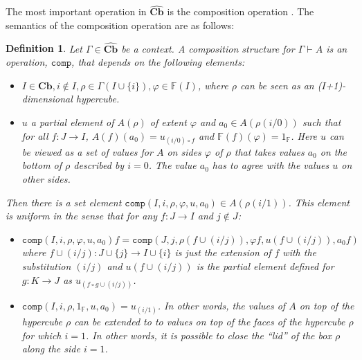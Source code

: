 \documentclass[12pt,a4paper,twoside,xetex]{book} %
\newcommand{\keyword}[1]{\emph{#1}\index{#1}}
\newtheorem{definition}[theorem]{Definition}
\newcommand{\psh}[1]{\widehat{#1}}
\newcommand{\op}[1]{\mathtt{#1}}
\newcommand{\cube}[0]{\textbf{Cb}}
\begin{document}
The most important operation in $\psh{\cube}$ is the composition operation 
\cite{Orton2019}. The semantics of the composition operation are as follows:

\begin{definition}\label{compdef}
Let $\Gamma \in \psh{\cube}$ be a context. A \keyword{composition structure} for $\Gamma \vdash A$ is an operation, 
$\op{comp}$, that depends on the following elements:

\begin{itemize}
\item $I \in \cube, i \not \in I, \rho \in \Gamma(I \cup \{i\}), \varphi 
\in \mathbb{F}(I)$, where $\rho$ can be seen as an ($I$+1)-dimensional 
hypercube.
\item $u$ a partial element of $A(\rho)$ of extent $\varphi$ and $a_0 \in 
A(\rho (i/0))$ such that for all $f:J\rightarrow I$, $A(f)(a_0) = u _{(i/0) 
\circ f}$ and $\mathbb{F}(f)(\varphi) = 1_{\mathbb{F}}$. Here $u$ can be viewed 
as a set of values for $A$ on sides $\varphi$ of $\rho$ that takes values $a_0$ 
on the bottom of $\rho$ described by $i=0$. The value $a_0$ has to agree with 
the values $u$ on other sides.
\end{itemize}

Then there is a set element $\op{comp}(I,i,\rho,\varphi, u,a_0)\in 
A(\rho(i/1))$. This element is uniform in the sense that for any $f:J 
\rightarrow I$ and $j \not \in J$: 

\begin{itemize}
\item $\op{comp} \left(I,i,\rho,\varphi, u , a_0 \right) f = 
\op{comp}(J,j,\rho(f \cup (i/j)), \varphi f, u(f \cup (i/j)), a_0 f)$  where $f 
\cup (i/j): J \cup \{j\} \rightarrow I \cup \{i\}$ is just the extension of $f$ 
with the substitution $(i/j)$ and $u(f \cup (i/j))$ is the partial element 
defined for $g: K \rightarrow J$ as $u_{(f \circ g \cup (i/j))}$.

\item $\op{comp}(I,i,\rho, 1_{\mathbb{F}}, u, a_0) = u_{(i/1)}$. In other 
words, the values of $A$ on top of the hypercube $\rho$ can be extended to to 
values on top of the faces of the hypercube $\rho$ for which $i=1$. In other 
words, it is possible to close the ``lid'' of the box $\rho$ along the side 
$i=1$.

\end{itemize}



\end{definition}
\end{document}
